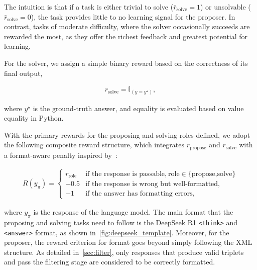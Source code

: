 \documentclass{article}
\begin{document}
The intuition is that if a task is either trivial to solve (\(\bar{r}_{\text{solve}} = 1\)) or unsolvable (\(\bar{r}_{\text{solve}} = 0\)), the task provides little to no learning signal for the proposer. In contrast, tasks of moderate difficulty, where the solver occasionally succeeds are rewarded the most, as they offer the richest feedback and greatest potential for learning.

For the solver, we assign a simple binary reward based on the correctness of its final output,

\begin{align}
r_\text{solve}=\mathbb{I}_{(y=y^\star)},
\label{eq:solver_reward}
\end{align}

where \(y^\star\) is the ground-truth answer, and equality is evaluated based on value equality in Python.

With the primary rewards for the proposing and solving roles defined, we adopt the following composite reward structure, which integrates \(r_\text{propose}\) and \(r_\text{solve}\) with a format-aware penalty inspired by~\citet{guo2025deepseek}:

\begin{align}
    R(y_\pi) =
    \begin{cases}
    r_\text{role} & \text{if the response is passable,}~\text{role}\in\{\text{propose,solve}\} \\
    -0.5 & \text{if the response is wrong but well-formatted,} \\
    -1 & \text{if the answer has formatting errors,}
    \end{cases}
\label{eq:azr_reward}
\end{align}

where \(y_\pi\) is the response of the language model. The main format that the proposing and solving tasks need to follow is the DeepSeek R1 \texttt{<think>} and \texttt{<answer>} format, as shown in~\cref{fig:deepseek_template}. Moreover, for the proposer, the reward criterion for format goes beyond simply following the XML structure. As detailed in~\cref{sec:filter}, only responses that produce valid triplets and pass the filtering stage are considered to be correctly formatted.
\end{document}
